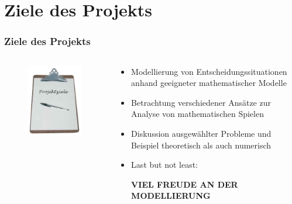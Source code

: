 \documentclass{beamer}
\begin{document}
	\section{Ziele des Projekts}
	
		\begin{frame}
			\frametitle{Ziele des Projekts}
			\begin{columns}
				\begin{column}{0.48\textwidth}
					\begin{figure}
						\includegraphics[scale = 0.53]{images/projektziele.jpg}	
					\end{figure}
				\end{column}
				\begin{column}{0.5\textwidth}
					\begin{itemize}
						\item Modellierung von Entscheidungssituationen anhand geeigneter mathematischer Modelle
						\item Betrachtung verschiedener Ansätze zur Analyse von mathematischen Spielen
						\item Diskussion ausgewählter Probleme und Beispiel theoretisch als auch numerisch
						\item Last but not least:
                            \pause
                            \vspace{0.25cm}
                            \begin{center}
                                \large
                                \textbf{VIEL FREUDE AN DER MODELLIERUNG}
                            \end{center}
					\end{itemize}
				\end{column}
			\end{columns}
		\end{frame}
\end{document}
